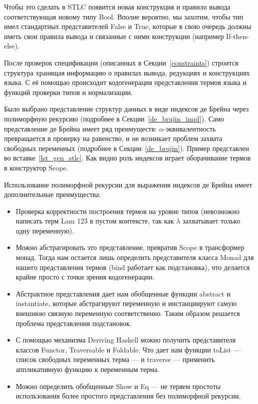 Чтобы это сделать в STLC появится новая конструкция и правило вывода соответствующая новому типу Bool. Вполне вероятно, мы захотим, чтобы тип имел стандартных представителей False и True, которые в свою очередь должны иметь свои правила вывода и связанные с ними конструкции (например If-then-else).

\hfill

После проверок спецификации (описанных в Секции~\ref{constraints}) строится структура хранящая информацию о правилах вывода, редукциях и конструкциях языка. С её помощью происходит кодогенерация представления термов языка и функций проверки типов и нормализации.

Было выбрано представление структур данных в виде индексов де Брейна\cite{de_brujin} через полиморфную рекурсию (подробнее в Секции~\ref{de_brujin_impl}). Само представление де Брейна имеет ряд преимуществ: $\alpha$-эквивалентность превращается в проверку на равенство, и не возникает проблем захвата свободных переменных (подробнее в Секции~\ref{de_brujin}). Пример представлен во вставке~\ref{lst_gen_stlc}. Как видно роль индексов играет оборачивание термов в конструктор Scope.

Использование полиморфной рекурсии для выражения индексов де Брейна имеет дополнительные преимущества:
\begin{itemize}
  \item Проверка корректности построения термов на уровне типов (невозможно написать терм Lam 123 в пустом контексте, так как $\lambda$ захватывает только одну переменную).
  \item Можно абстрагировать это представление, превратив Scope в трансформер монад. Тогда нам остается лишь определить представителя класса Monad для нашего представления термов (bind работает как подстановка), что делается крайне просто с точки зрения кодогенерации.
  \item Абстрактное представления дает нам обобщенные функции abstract и instantiate, которые абстрагируют переменную и инстанциируют самую внешнюю связную переменную соответственно. Таким образом решается проблема представления подстановок.
  \item С помощью механизма Deriving Haskell можно получить представителя классов Functor, Traversable и Foldable. Что дает нам функции toList --- список свободных переменных терма --- и traverse --- применить аппликативную функцию к переменным терма.
  \item Можно определить обобщенные Show и Eq --- не теряем простоты использования более простого представления без полиморфной рекурсии.
\end{itemize}

